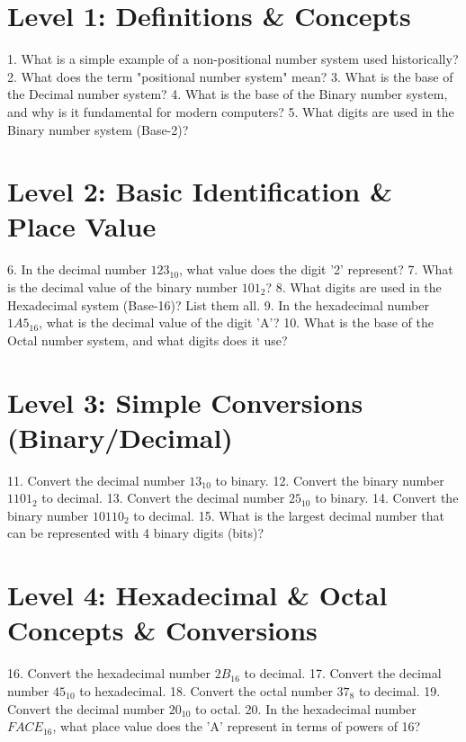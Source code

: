 \documentclass[11pt,a4paper,twoside]{article}
\begin{document}
\bigskip\noindent
\blindtext

\section{Level 1: Definitions \& Concepts}

1.  What is a simple example of a non-positional number system used historically?
2.  What does the term "positional number system" mean?
3.  What is the base of the Decimal number system?
4.  What is the base of the Binary number system, and why is it fundamental for modern computers?
5.  What digits are used in the Binary number system (Base-2)?

\section{Level 2: Basic Identification \& Place Value}

6.  In the decimal number $123_{10}$, what value does the digit '2' represent?
7.  What is the decimal value of the binary number $101_2$?
8.  What digits are used in the Hexadecimal system (Base-16)? List them all.
9.  In the hexadecimal number $1A5_{16}$, what is the decimal value of the digit 'A'?
10. What is the base of the Octal number system, and what digits does it use?

\section{Level 3: Simple Conversions (Binary/Decimal)}

11. Convert the decimal number $13_{10}$ to binary.
12. Convert the binary number $1101_2$ to decimal.
13. Convert the decimal number $25_{10}$ to binary.
14. Convert the binary number $10110_2$ to decimal.
15. What is the largest decimal number that can be represented with 4 binary digits (bits)?

\section{Level 4: Hexadecimal \& Octal Concepts \& Conversions}

16. Convert the hexadecimal number $2B_{16}$ to decimal.
17. Convert the decimal number $45_{10}$ to hexadecimal.
18. Convert the octal number $37_8$ to decimal.
19. Convert the decimal number $20_{10}$ to octal.
20. In the hexadecimal number $FACE_{16}$, what place value does the 'A' represent in terms of powers of 16?
\end{document}
